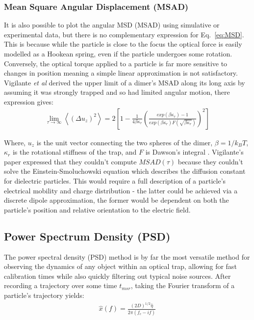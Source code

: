 \subsubsection{Mean Square Angular Displacement (MSAD)}
It is also possible to plot the angular MSD (MSAD) using 
simulative or experimental data, but there is no complementary 
expression for Eq.~\eqref{eq:MSD}. This is because while the 
particle is close to the focus the optical force is easily 
modelled as a Hookean spring, even if the particle undergoes
some rotation. Conversely, the optical torque applied to a 
particle is far more sensitive to changes in position meaning 
a simple linear approximation is not satisfactory. 
Vigilante \textit{et al} \cite{Vigilante2020} derived the 
upper limit of a dimer's MSAD along its long axis by assuming 
it was strongly trapped and so had limited angular motion, 
there expression gives:
\begin{align}
	\lim_{\tau\to\infty}\left<(\Delta u_z)^2\right> = 
	2\left[1-\frac{1}{4\beta\kappa_r} 
	\left(\frac{exp(\beta\kappa_r)-1}
	{exp(\beta\kappa_r)F(\sqrt{\beta\kappa_r})
	}\right)^2\right]
\end{align}  

Where, $u_z$ is the unit vector connecting the two spheres of 
the dimer, $\beta=1/k_BT$, $\kappa_r$ is the rotational stiffness 
of the trap, and $F$ is Dawson's integral \cite{Oldham2008}. 
Vigilante's paper expressed that they couldn't compute 
$MSAD(\tau)$ because they couldn't solve the Einstein-Smoluchowski 
equation which describes the diffusion constant for dielectric 
particles. This would require a full description of a particle's 
electrical mobility and charge distribution - the latter could be 
achieved via a discrete dipole approximation, the former would be 
dependent on both the particle's position and relative orientation 
to the electric field.

\subsection{Power Spectrum Density (PSD)}
The power spectral density (PSD) method is by far the most versatile 
method for observing the dynamics of any object within an optical trap, 
allowing for fast calibration times while also quickly filtering out 
typical noise sources. After recording a trajectory over some time 
$t_{msr}$, taking the Fourier transform of a particle's trajectory 
yields:
\begin{align}
	\hat{x}(f) = \frac{(2D)^{1/2}\hat{\eta}}{2\pi(f_c-if)}
\end{align}

